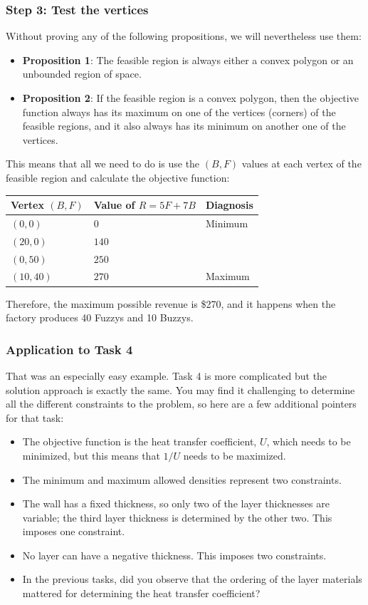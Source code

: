 \documentclass{article}
\begin{document}
\subsubsection*{Step 3: Test the vertices}
Without proving any of the following propositions, we will nevertheless use them:
\begin{itemize}
    \item \textbf{Proposition 1}: The feasible region is always either a convex polygon
        or an unbounded region of space.
    \item \textbf{Proposition 2}: If the feasible region is a convex polygon, then the
        objective function always has its maximum on one of the vertices (corners) of
        the feasible regions, and it also always has its minimum on another one of the
        vertices.
\end{itemize}
This means that all we need to do is use the $(B,F)$ values at each vertex of the feasible
region and calculate the objective function:

\begin{center}
\begin{tabular}{lll} \toprule
Vertex $(B,F)$ & Value of $R = 5 F + 7 B$ & Diagnosis \\ \midrule
$(0,0)$ & $0$ & Minimum \\
$(20,0)$ & $140$ & \\
$(0,50)$ & $250$ & \\
$(10,40)$ & $270$ & Maximum \\ \bottomrule
\end{tabular}
\end{center}

Therefore, the maximum possible revenue is \$270, and it happens when the factory
produces 40 Fuzzys and 10 Buzzys.

\subsubsection*{Application to Task 4}
That was an especially easy example.  Task 4 is more complicated but the
solution approach is exactly the same.  You may find it challenging to determine
all the different constraints to the problem, so here are a few additional pointers
for that task:
\begin{itemize}
    \item The objective function is the heat transfer coefficient, $U$, which needs to
        be minimized, but this means that $1/U$ needs to be maximized.
    \item The minimum and maximum allowed densities represent two constraints.
    \item The wall has a fixed thickness, so only two of the layer thicknesses
        are variable; the third layer thickness is determined by the other two.
        This imposes one constraint.
    \item No layer can have a negative thickness.  This imposes two constraints.
    \item In the previous tasks, did you observe that the ordering of the layer
        materials mattered for determining the heat transfer coefficient?
\end{itemize}
\end{document}
